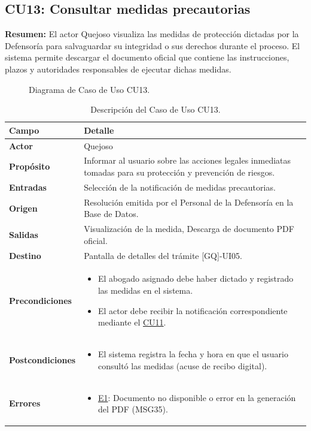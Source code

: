 \begin{appendices}
\subsection{CU13: Consultar medidas precautorias}

\textbf{Resumen:} 
El actor Quejoso visualiza las medidas de protección dictadas por la Defensoría para salvaguardar su integridad o sus derechos durante el proceso. El sistema permite descargar el documento oficial que contiene las instrucciones, plazos y autoridades responsables de ejecutar dichas medidas.

\begin{figure}[htbp]
    \centering
    \figCUtrece
    \caption{Diagrama de Caso de Uso CU13.}
    \label{fig:cu13}
\end{figure}

\begin{table}[htbp]
\centering
\small
\begin{tabular}{|p{3.5cm}|p{10.5cm}|}
\hline
\rowcolor[HTML]{EFEFEF} 
\textbf{Campo} & \textbf{Detalle} \\ \hline
\textbf{Actor} & Quejoso \\ \hline
\textbf{Propósito} & Informar al usuario sobre las acciones legales inmediatas tomadas para su protección y prevención de riesgos. \\ \hline
\textbf{Entradas} & Selección de la notificación de medidas precautorias. \\ \hline
\textbf{Origen} & Resolución emitida por el Personal de la Defensoría en la Base de Datos. \\ \hline
\textbf{Salidas} & Visualización de la medida, Descarga de documento PDF oficial. \\ \hline
\textbf{Destino} & Pantalla de detalles del trámite [GQ]-UI05. \\ \hline
\textbf{Precondiciones} & 
\begin{itemize}[nosep, leftmargin=*]
    \item El abogado asignado debe haber dictado y registrado las medidas en el sistema.
    \item El actor debe recibir la notificación correspondiente mediante el \hyperlink{anexo:casos_uso}{CU11}.
\end{itemize} \\ \hline
\textbf{Postcondiciones} & 
\begin{itemize}[nosep, leftmargin=*]
    \item El sistema registra la fecha y hora en que el usuario consultó las medidas (acuse de recibo digital).
\end{itemize} \\ \hline
\textbf{Errores} & 
\begin{itemize}[nosep, leftmargin=*]
    \item \hyperlink{err:E18}{E1}: Documento no disponible o error en la generación del PDF (MSG35).
\end{itemize} \\ \hline
\end{tabular}
\caption{Descripción del Caso de Uso CU13.}
\label{tab:cu13_especificacion}
\end{table}


\end{appendices}
